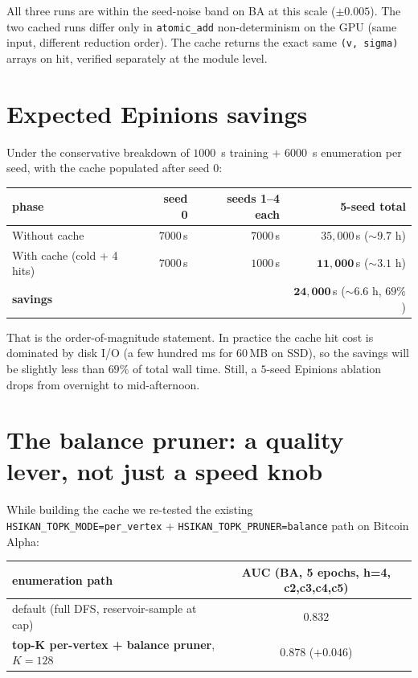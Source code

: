 \documentclass[11pt,a4paper]{article}
\begin{document}
All three runs are within the seed-noise band on BA at this scale
($\pm 0.005$).  The two cached runs differ only in
\texttt{atomic\_add} non-determinism on the GPU (same input,
different reduction order).  The cache returns the exact same
\texttt{(v, sigma)} arrays on hit, verified separately at the
module level.

\section{Expected Epinions savings}

Under the conservative breakdown of $1000$~s training $+$ $6000$~s
enumeration per seed, with the cache populated after seed 0:

\begin{center}\small
\begin{tabular}{l r r r}
\toprule
\textbf{phase}        & \textbf{seed 0} & \textbf{seeds 1--4 each} & \textbf{5-seed total} \\
\midrule
Without cache         & $7000\,$s   & $7000\,$s   & $35{,}000\,$s   ($\sim 9.7$ h) \\
With cache (cold + 4 hits) & $7000\,$s & $1000\,$s   & $\mathbf{11{,}000\,}$s ($\sim 3.1$ h) \\
\midrule
\textbf{savings}      &             &             & $\mathbf{24{,}000\,}$s ($\sim 6.6$ h, $69\%$) \\
\bottomrule
\end{tabular}
\end{center}

That is the order-of-magnitude statement.  In practice the cache
hit cost is dominated by disk I/O (a few hundred ms for $60\,$MB
on SSD), so the savings will be slightly less than $69\%$ of total
wall time.  Still, a $5$-seed Epinions ablation drops from
overnight to mid-afternoon.

\section{The balance pruner: a quality lever, not just a speed knob}

While building the cache we re-tested the existing
\texttt{HSIKAN\_TOPK\_MODE=per\_vertex} +
\texttt{HSIKAN\_TOPK\_PRUNER=balance} path on Bitcoin Alpha:

\begin{center}\small
\begin{tabular}{l c}
\toprule
\textbf{enumeration path} & \textbf{AUC} (BA, 5 epochs, h=4, c2,c3,c4,c5) \\
\midrule
default (full DFS, reservoir-sample at cap)    & $0.832$ \\
\textbf{top-K per-vertex + balance pruner}, $K{=}128$ & $\mathbf{0.878}$ ($+0.046$) \\
\bottomrule
\end{tabular}
\end{center}
\end{document}
